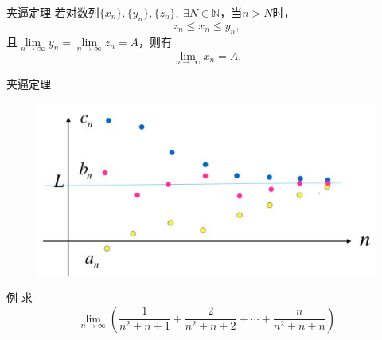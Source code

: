 \documentclass[]{beamer}
\begin{document}
\begin{frame}{夹逼定理}
    若对数列$\{x_n\},\{y_n\},\{z_n\},\ \exists N\in\mathbb{N}$，当$n>N$时，
    \[
    z_n\le x_n\le y_n,
    \]
    且$\lim\limits_{n\rightarrow\infty}y_n=\lim\limits_{n\rightarrow\infty}z_n=A$，则有
    \[
    \lim\limits_{n\rightarrow\infty}x_n = A.
    \]
\end{frame}

\begin{frame}{夹逼定理}
    \begin{figure}[H]
        \centering
        \includegraphics[width=0.7\linewidth]{squeeze.png}
    \end{figure}
\end{frame}

\begin{frame}{例}
    求
    \[
    \lim_{n\rightarrow\infty}\left(\frac{1}{n^2+n+1}+\frac{2}{n^2+n+2}+\cdots+\frac{n}{n^2+n+n}\right)
    \]
\end{frame}

\end{document}
